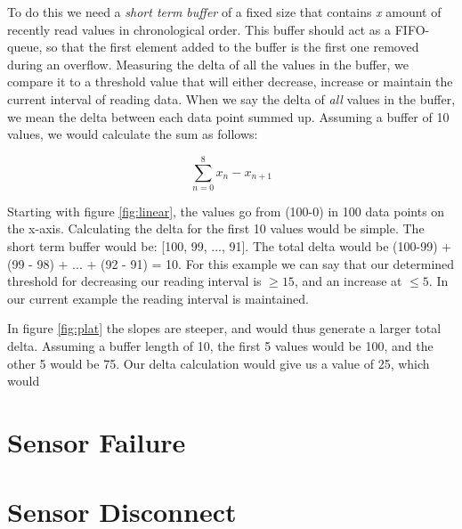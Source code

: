 To do this we need a \textit{short term buffer} of a fixed size that contains \textit{x} amount of recently read values in chronological order. This buffer should act as a FIFO-queue, so that the first element added to the buffer is the first one removed during an overflow. Measuring the delta of all the values in the buffer, we compare it to a threshold value that will either decrease, increase or maintain the current interval of reading data. When we say the delta of \textit{all} values in the buffer, we mean the delta between each data point summed up. Assuming a buffer of 10 values, we would calculate the sum as follows:

$$\sum_{n=0}^{8} x_n - x_{n+1}$$

Starting with figure \ref{fig:linear}, the values go from (100-0) in 100 data points on the x-axis. Calculating the delta for the first 10 values would be simple. The short term buffer would be: [100, 99, ..., 91]. The total delta would be (100-99) + (99 - 98) + ... + (92 - 91) = 10. For this example we can say that our determined threshold for decreasing our reading interval is $\geq 15$, and an increase at $\leq 5$. In our current example the reading interval is maintained. 

In figure \ref{fig:plat} the slopes are steeper, and would thus generate a larger total delta. Assuming a buffer length of 10, the first 5 values would be 100, and the other 5 would be 75. Our delta calculation would give us a value of 25, which would 



\section{Sensor Failure}

\section{Sensor Disconnect}